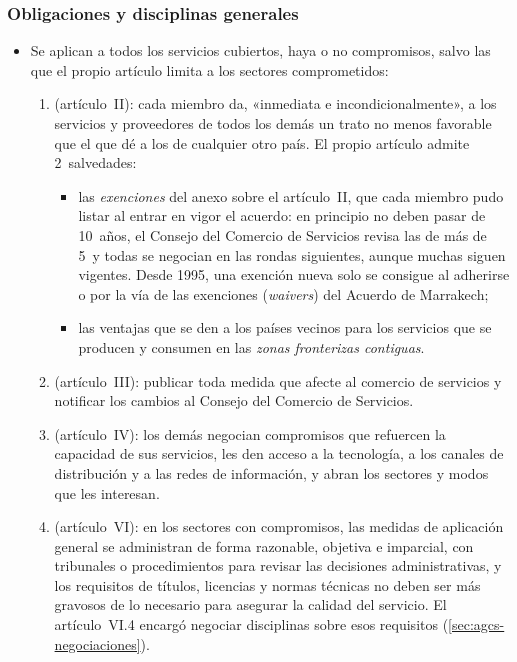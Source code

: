 \documentclass[11pt]{article}
\begin{document}
\subsubsection{Obligaciones y disciplinas generales}\label{sec:obligaciones}

\begin{itemize}
\item Se aplican a todos los servicios cubiertos, haya o no compromisos, salvo las que el propio artículo limita a los sectores comprometidos\nocite{OMC1994AGCS}:
  \begin{enumerate}
  \item {} (artículo~II): cada miembro da, «inmediata e incondicionalmente», a los servicios y proveedores de todos los demás un trato no menos favorable que el que dé a los de cualquier otro país. El propio artículo admite 2~salvedades:
    \begin{itemize}
    \item las \emph{exenciones} del anexo sobre el artículo~II, que cada miembro pudo listar al entrar en vigor el acuerdo: en principio no deben pasar de 10~años, el Consejo del Comercio de Servicios revisa las de más de 5~y todas se negocian en las rondas siguientes, aunque muchas siguen vigentes. Desde 1995, una exención nueva solo se consigue al adherirse o por la vía de las exenciones (\emph{waivers}) del Acuerdo de Marrakech;
    \item las ventajas que se den a los países vecinos para los servicios que se producen y consumen en las \emph{zonas fronterizas contiguas}.
    \end{itemize}
  \item {} (artículo~III): publicar toda medida que afecte al comercio de servicios y notificar los cambios al Consejo del Comercio de Servicios.
  \item {} (artículo~IV): los demás negocian compromisos que refuercen la capacidad de sus servicios, les den acceso a la tecnología, a los canales de distribución y a las redes de información, y abran los sectores y modos que les interesan.
  \item {} (artículo~VI): en los sectores con compromisos, las medidas de aplicación general se administran de forma razonable, objetiva e imparcial, con tribunales o procedimientos para revisar las decisiones administrativas, y los requisitos de títulos, licencias y normas técnicas no deben ser más gravosos de lo necesario para asegurar la calidad del servicio. El artículo~VI.4 encargó negociar disciplinas sobre esos requisitos (\ref{sec:agcs-negociaciones}).

\end{enumerate}
\end{itemize}
\end{document}
